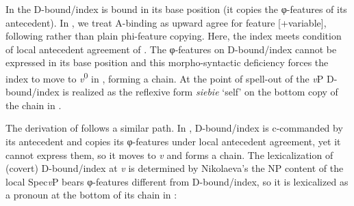 \documentclass[output=paper,modfonts,nonflat
]{langsci/langscibook}
\begin{document}
\z\z

\noindent In  the D-bound/index is bound in its base position (it copies the φ-features of its antecedent). In \cite{witkosetal_forth}, we treat A-binding as upward agree for feature [+variable], following \cite{hicks2009} rather than plain phi-feature copying.  Here, the index meets  condition of local antecedent agreement of . The φ-features on D-bound/index cannot be expressed in its base position and this morpho-syntactic deficiency forces the index to move to \textit{v}\textsuperscript{0} in , forming a chain. At the point of spell-out of the \textit{v}P D-bound/index is realized as the reflexive form \textit{siebie} ‘self’ on the bottom copy of the chain in .

The derivation of  follows a similar path. In , D-bound/index is c-commanded by its antecedent and copies its φ-features under local antecedent agreement, yet it cannot express them, so it moves to \textit{v} and forms a chain. The lexicalization of (covert) D-bound/index at \textit{v} is determined by Nikolaeva’s  the NP content of the local Spec\textit{v}P bears φ-features different from D-bound/index, so it is lexicalized as a pronoun at the bottom of its chain in :
\end{document}
